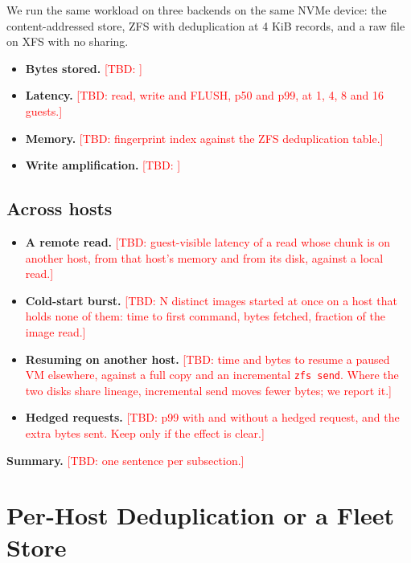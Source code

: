 \documentclass[10pt,twocolumn]{article}
\newcommand{\TBD}[1]{\textcolor{red}{[TBD: #1]}}
\begin{document}
We run the same workload on three backends on the same NVMe device: the content-addressed store, ZFS with deduplication at 4 KiB records, and a raw file on XFS with no sharing.

\begin{itemize}
\item \textbf{Bytes stored.} \TBD{}

\item \textbf{Latency.} \TBD{read, write and FLUSH, p50 and p99, at 1, 4, 8 and 16 guests.}

\item \textbf{Memory.} \TBD{fingerprint index against the ZFS deduplication table.}

\item \textbf{Write amplification.} \TBD{}

\end{itemize}

\subsection{Across hosts}

\begin{itemize}
\item \textbf{A remote read.} \TBD{guest-visible latency of a read whose chunk is on another host, from that host's memory and from its disk, against a local read.}

\item \textbf{Cold-start burst.} \TBD{N distinct images started at once on a host that holds none of them: time to first command, bytes fetched, fraction of the image read.}

\item \textbf{Resuming on another host.} \TBD{time and bytes to resume a paused VM elsewhere, against a full copy and an incremental \texttt{zfs send}. Where the two disks share lineage, incremental send moves fewer bytes; we report it.}

\item \textbf{Hedged requests.} \TBD{p99 with and without a hedged request, and the extra bytes sent. Keep only if the effect is clear.}

\end{itemize}

\textbf{Summary.} \TBD{one sentence per subsection.}

\section{Per-Host Deduplication or a Fleet Store}
\end{document}
